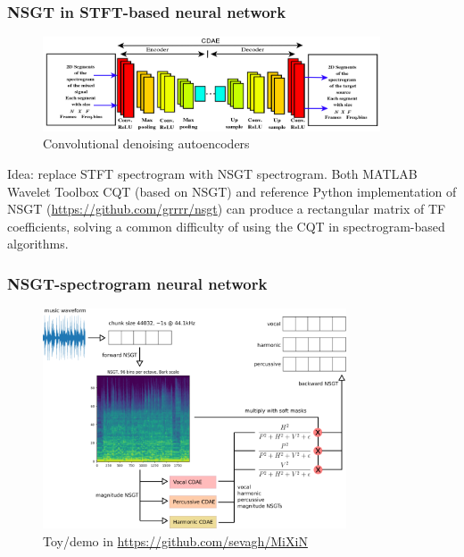 \documentclass{beamer}
\begin{document}
\begin{frame}
	\frametitle{NSGT in STFT-based neural network}
	\begin{figure}
		\includegraphics[width=10cm]{./cdae_arch.png}
		\caption{Convolutional denoising autoencoders}
	\end{figure}
	Idea: replace STFT spectrogram with NSGT spectrogram. Both MATLAB Wavelet Toolbox CQT (based on NSGT) and reference Python implementation of NSGT (\href{https://github.com/grrrr/nsgt}{https://github.com/grrrr/nsgt}) can produce a rectangular matrix of TF coefficients, solving a common difficulty of using the CQT in spectrogram-based algorithms.
\end{frame}

\begin{frame}
	\frametitle{NSGT-spectrogram neural network}
	\begin{figure}
		\includegraphics[width=9cm]{./mixin_arch.png}
		\caption{Toy/demo in \href{https://github.com/sevagh/MiXiN}{https://github.com/sevagh/MiXiN}}
	\end{figure}
\end{frame}
\end{document}
